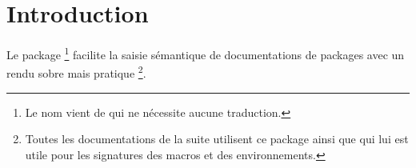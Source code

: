 \documentclass[12pt,a4paper]{article}
\begin{document}
\section{Introduction}

Le package 
\footnote{
    Le nom vient de  qui ne nécessite aucune traduction.
}
facilite la saisie sémantique de documentations de packages avec un rendu sobre mais pratique
\footnote{
    Toutes les documentations de la suite  utilisent ce package ainsi que  qui lui est utile pour les signatures des macros et des environnements.
}.
\end{document}
